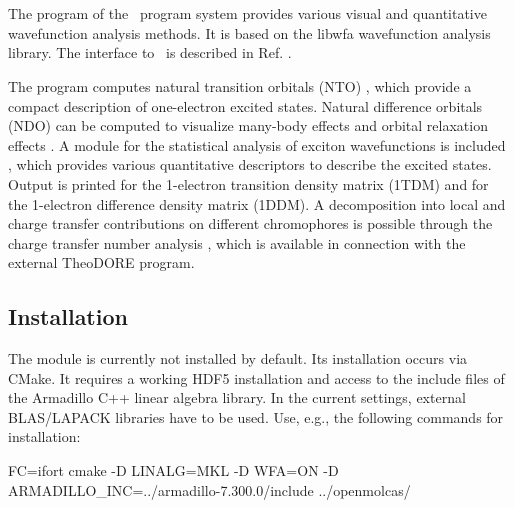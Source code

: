 
\section{}
\label{UG:sec:wfa}

The  program of the \molcas\ program system provides various
visual and quantitative wavefunction analysis methods.
It is based on the libwfa \cite{libwfa} wavefunction analysis library.
The interface to \molcas\ is described in Ref. \cite{Molcas_libwfa}.

The program computes natural transition
orbitals (NTO) \cite{Martin2003, Plasser2014}, which provide a compact description of
one-electron excited states. Natural difference orbitals (NDO) \cite{Plasser2014} can be
computed to visualize many-body effects and orbital relaxation effects \cite{Plasser2014b}. A module for the
statistical analysis of exciton wavefunctions is included \cite{Bappler2014, Plasser2015},
which provides various quantitative descriptors to describe the excited states.
Output is printed for the 1-electron transition density matrix (1TDM) and for the 1-electron difference density matrix (1DDM).
A decomposition into local and charge transfer contributions on different chromophores
is possible through the charge transfer number analysis \cite{Plasser2012}, which is
available in connection with the external TheoDORE \cite{TheoDORE} program.

\subsection{Installation}
The  module is currently not installed by default.
Its installation occurs via CMake.
It requires a working HDF5 installation and access to the include files of the Armadillo C++ linear algebra library.
In the current settings, external BLAS/LAPACK libraries have to be used.
Use, e.g., the following commands for installation:

\begin{inputlisting}
FC=ifort cmake -D LINALG=MKL -D WFA=ON -D ARMADILLO_INC=../armadillo-7.300.0/include ../openmolcas/
\end{inputlisting}

